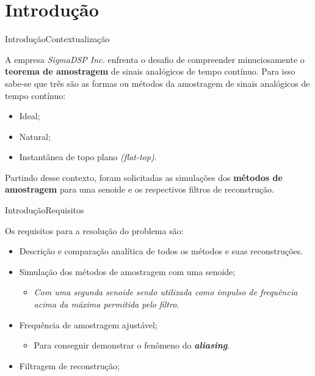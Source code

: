 



% 


\section{Introdução}

\begin{frame}{Introdução}{Contextualização}

    A empresa \textit{SigmaDSP Inc.} enfrenta o desafio de compreender minuciosamente o \textbf{teorema de amostragem} de sinais analógicos de tempo contínuo. Para isso sabe-se que três são as formas ou
métodos da amostragem de sinais analógicos de tempo contínuo:
    \begin{itemize}
        \item Ideal;
        \item Natural;
        \item Instantânea de topo plano \textit{(flat-top)}.
    \end{itemize}
    Partindo desse contexto, foram solicitadas as simulações dos \textbf{métodos de amostragem} para uma senoide e os respectivos filtros de reconstrução. 
    
\end{frame}

\begin{frame}{Introdução}{Requisitos}

	Os requisitos para a resolução do problema são:
	\begin{itemize}
		\item Descrição e comparação analítica de todos os métodos e suas reconstruções. 
		\item Simulação dos métodos de amostragem com uma senoide;
            \begin{itemize}
                \item \textit{Com uma segunda senoide sendo utilizada como impulso de frequência acima da máxima permitida pelo filtro.}
            \end{itemize}
        \item Frequência de amostragem ajustável;
            \begin{itemize}
                \item Para conseguir demonstrar o fenômeno do \textit{\textbf{aliasing}}.
            \end{itemize}
        \item Filtragem de reconstrução;
        
	\end{itemize}
\end{frame}